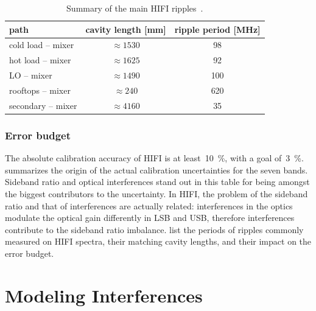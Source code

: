 \begin{table}[p]
    \centering
    \begin{tabular}{lcc}
        \toprule
            path & cavity length [\si{\milli\meter}] & ripple period [\si{\mega\hertz}]\\
        \midrule
            cold load -- mixer & $\approx\num{1530}$ &  98\\
            hot load -- mixer  & $\approx\num{1625}$ &  92\\
            LO -- mixer        & $\approx\num{1490}$ & 100\\
            rooftops -- mixer  & $\approx\num{ 240}$ & 620\\
            secondary -- mixer & $\approx\num{4160}$ &  35\\
        \bottomrule
    \end{tabular}
    \caption{
        Summary of the main HIFI ripples~\parencite{risacher2011standingwaves}.
    }
    \label{tab:ripple_periods}
\end{table}



\FloatBarrier
\subsubsection{Error budget}
The absolute calibration accuracy of HIFI is at least~\SI{10}{\percent}, with a goal of~\SI{3}{\percent}.
 summarizes the origin of the actual calibration uncertainties for the seven bands.
Sideband ratio and optical interferences stand out in this table for being amongst the biggest contributors to the uncertainty.
In HIFI, the problem of the sideband ratio and that of interferences are actually related:
interferences in the optics modulate the optical gain differently in LSB and USB, therefore interferences contribute to the sideband ratio imbalance.
 list the periods of ripples commonly measured on HIFI spectra, their matching cavity lengths, and their impact on the error budget.






\section{Modeling Interferences}

